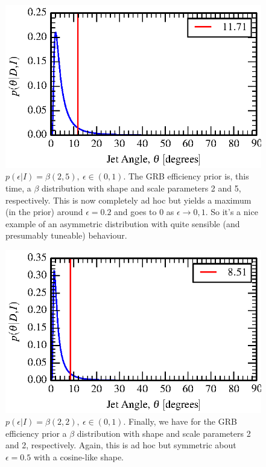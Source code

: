 \documentclass[nofootinbib]{revtex4}
\begin{document}
\begin{figure}[h!]
\includegraphics{jet_angle_posterior_s6UL_TEST_betaEffPrior-2-5.eps}
\caption{$p(\epsilon|I) = \beta(2,5),~\epsilon \in (0,1)$.  The GRB efficiency
prior is, this time, a $\beta$ distribution with shape and scale parameters 2
and 5, respectively.  This is now completely ad hoc but yields a maximum (in the
prior) around $\epsilon=0.2$ and goes to 0 as $\epsilon \rightarrow 0,1$.  So
it's a nice example of an asymmetric distribution with quite sensible (and
presumably tuneable) behaviour.}
\end{figure}

\begin{figure}[h!]
\includegraphics{jet_angle_posterior_s6UL_TEST_betaEffPrior-2-2.eps}
\caption{$p(\epsilon|I) = \beta(2,2),~\epsilon \in (0,1)$.  Finally, we have for
the GRB efficiency prior a $\beta$ distribution with shape and scale parameters 2
and 2, respectively.  Again, this is ad hoc but symmetric about $\epsilon=0.5$
with a cosine-like shape.}
\end{figure}


\end{document}
